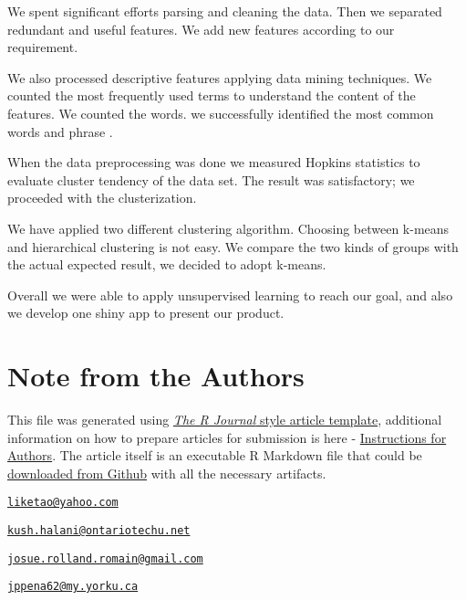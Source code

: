 We spent significant efforts parsing and cleaning the data. Then we
separated redundant and useful features. We add new features according
to our requirement.

We also processed descriptive features applying data mining techniques.
We counted the most frequently used terms to understand the content of
the features. We counted the words. we successfully identified the most
common words and phrase .

When the data preprocessing was done we measured Hopkins statistics to
evaluate cluster tendency of the data set. The result was satisfactory;
we proceeded with the clusterization.

We have applied two different clustering algorithm. Choosing between
k-means and hierarchical clustering is not easy. We compare the two
kinds of groups with the actual expected result, we decided to adopt
k-means.

Overall we were able to apply unsupervised learning to reach our goal,
and also we develop one shiny app to present our product.



\hypertarget{note-from-the-authors}{%
\section{Note from the Authors}\label{note-from-the-authors}}

This file was generated using
\href{https://github.com/rstudio/rticles}{\emph{The R Journal} style
article template}, additional information on how to prepare articles for
submission is here -
\href{https://journal.r-project.org/share/author-guide.pdf}{Instructions
for Authors}. The article itself is an executable R Markdown file that
could be
\href{https://github.com/ivbsoftware/big-data-final-2/blob/master/docs/R_Journal/big-data-final-2/}{downloaded
from Github} with all the necessary artifacts.


\address{%
Ketao Li\\
York University\\
\\
}
\href{mailto:liketao@yahoo.com}{\nolinkurl{liketao@yahoo.com}}

\address{%
Kush Halani\\
York University\\
\\
}
\href{mailto:kush.halani@ontariotechu.net}{\nolinkurl{kush.halani@ontariotechu.net}}

\address{%
Josue Romain\\
York University\\
\\
}
\href{mailto:josue.rolland.romain@gmail.com}{\nolinkurl{josue.rolland.romain@gmail.com}}

\address{%
Juan Peña\\
York University\\
\\
}
\href{mailto:jppena62@my.yorku.ca}{\nolinkurl{jppena62@my.yorku.ca}}

